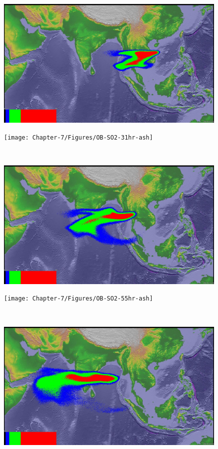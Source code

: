 \begin{figure}[!htb]
\begin{minipage}{.325\textwidth}
        \includegraphics[width=0.99 \textwidth]{Chapter-7/Figures/SPH-Plume-31hr-ash}
    \end{minipage}%
    \begin{minipage}{.325 \textwidth}
        \centering
        \texttt{[image: Chapter-7/Figures/OB-SO2-31hr-ash]}
    \end{minipage}%
\\
    \begin{minipage}{.325\textwidth}
        \centering
        \includegraphics[width=0.99 \textwidth]{Chapter-7/Figures/SPH-Plume-55hr-ash}
    \end{minipage}%
    \begin{minipage}{.325 \textwidth}
        \centering
        \texttt{[image: Chapter-7/Figures/OB-SO2-55hr-ash]}
    \end{minipage}%
\\
    \begin{minipage}{.325\textwidth}
        \centering
        \includegraphics[width=0.99 \textwidth]{Chapter-7/Figures/SPH-Plume-73hr-ash}

\end{minipage}
\end{figure}
